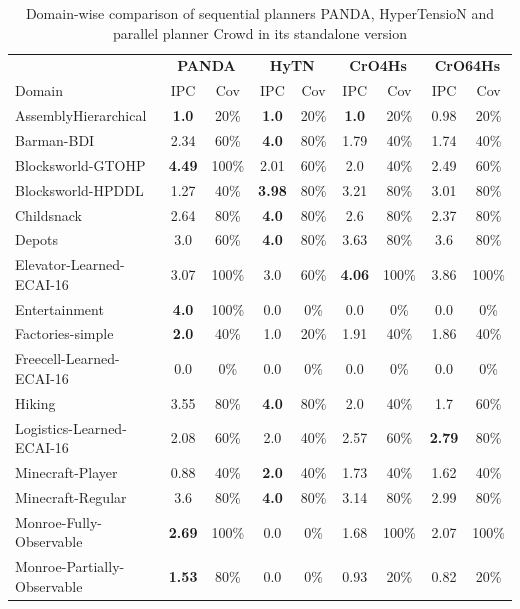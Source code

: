 \begin{table}
	\caption{Domain-wise comparison of sequential planners PANDA, HyperTensioN and parallel planner Crowd in its standalone version}
	\label{table: results old}
	\centering

\begin{tabular}{|l|cc|cc|cc|cc|}
	\hline
	& \multicolumn{2}{c|}{\textbf{PANDA}} & \multicolumn{2}{c|}{\textbf{HyTN}} & \multicolumn{2}{c|}{\textbf{CrO4Hs}} & \multicolumn{2}{c|}{\textbf{CrO64Hs}}\\
	Domain & IPC & Cov & IPC & Cov & IPC & Cov & IPC & Cov\\
	\hline
	AssemblyHierarchical & \textbf{1.0} & 20\%  & \textbf{1.0} & 20\%  & \textbf{1.0} & 20\%  & 0.98 & 20\%  \\
	Barman-BDI & 2.34 & 60\%  & \textbf{4.0} & 80\%  & 1.79 & 40\%  & 1.74 & 40\%  \\
	Blocksworld-GTOHP & \textbf{4.49} & 100\%  & 2.01 & 60\%  & 2.0 & 40\%  & 2.49 & 60\%  \\
	Blocksworld-HPDDL & 1.27 & 40\%  & \textbf{3.98} & 80\%  & 3.21 & 80\%  & 3.01 & 80\%  \\
	Childsnack & 2.64 & 80\%  & \textbf{4.0} & 80\%  & 2.6 & 80\%  & 2.37 & 80\%  \\
	Depots & 3.0 & 60\%  & \textbf{4.0} & 80\%  & 3.63 & 80\%  & 3.6 & 80\%  \\
	Elevator-Learned-ECAI-16 & 3.07 & 100\%  & 3.0 & 60\%  & \textbf{4.06} & 100\%  & 3.86 & 100\%  \\
	Entertainment & \textbf{4.0} & 100\%  & 0.0 & 0\%  & 0.0 & 0\%  & 0.0 & 0\%  \\
	Factories-simple & \textbf{2.0} & 40\%  & 1.0 & 20\%  & 1.91 & 40\%  & 1.86 & 40\%  \\
	Freecell-Learned-ECAI-16 & 0.0 & 0\%  & 0.0 & 0\%  & 0.0 & 0\%  & 0.0 & 0\%  \\
	Hiking & 3.55 & 80\%  & \textbf{4.0} & 80\%  & 2.0 & 40\%  & 1.7 & 60\%  \\
	Logistics-Learned-ECAI-16 & 2.08 & 60\%  & 2.0 & 40\%  & 2.57 & 60\%  & \textbf{2.79} & 80\%  \\
	Minecraft-Player & 0.88 & 40\%  & \textbf{2.0} & 40\%  & 1.73 & 40\%  & 1.62 & 40\%  \\
	Minecraft-Regular & 3.6 & 80\%  & \textbf{4.0} & 80\%  & 3.14 & 80\%  & 2.99 & 80\%  \\
	Monroe-Fully-Observable & \textbf{2.69} & 100\%  & 0.0 & 0\%  & 1.68 & 100\%  & 2.07 & 100\%  \\
	Monroe-Partially-Observable & \textbf{1.53} & 80\%  & 0.0 & 0\%  & 0.93 & 20\%  & 0.82 & 20\%  \\

\end{tabular}
\end{table}
